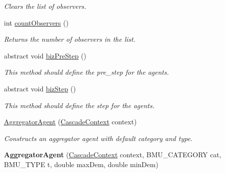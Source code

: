\begin{DoxyCompactItemize}
\begin{DoxyCompactList}\small\item\em Clears the list of observers. \end{DoxyCompactList}\item 
int \hyperlink{classuk_1_1ac_1_1dmu_1_1iesd_1_1cascade_1_1agents_1_1aggregators_1_1_aggregator_agent_a574243c5d86f601a4d1a150bec350df3}{count\-Observers} ()
\begin{DoxyCompactList}\small\item\em Returns the number of observers in the list. \end{DoxyCompactList}\item 
abstract void \hyperlink{classuk_1_1ac_1_1dmu_1_1iesd_1_1cascade_1_1agents_1_1aggregators_1_1_aggregator_agent_a9361ca72a6aebe4868b4d8b662088969}{biz\-Pre\-Step} ()
\begin{DoxyCompactList}\small\item\em This method should define the pre\-\_\-step for the agents. \end{DoxyCompactList}\item 
abstract void \hyperlink{classuk_1_1ac_1_1dmu_1_1iesd_1_1cascade_1_1agents_1_1aggregators_1_1_aggregator_agent_a7ef5c9ee76ef46f0b2d5f227bc885dae}{biz\-Step} ()
\begin{DoxyCompactList}\small\item\em This method should define the step for the agents. \end{DoxyCompactList}\item 
\hypertarget{classuk_1_1ac_1_1dmu_1_1iesd_1_1cascade_1_1agents_1_1aggregators_1_1_aggregator_agent_a35fce3f492c1e1305d3d776b1afa488b}{\hyperlink{classuk_1_1ac_1_1dmu_1_1iesd_1_1cascade_1_1agents_1_1aggregators_1_1_aggregator_agent_a35fce3f492c1e1305d3d776b1afa488b}{Aggregator\-Agent} (\hyperlink{classuk_1_1ac_1_1dmu_1_1iesd_1_1cascade_1_1context_1_1_cascade_context}{Cascade\-Context} context)}\label{classuk_1_1ac_1_1dmu_1_1iesd_1_1cascade_1_1agents_1_1aggregators_1_1_aggregator_agent_a35fce3f492c1e1305d3d776b1afa488b}

\begin{DoxyCompactList}\small\item\em Constructs an aggregator agent with default category and type. \end{DoxyCompactList}\item 
\hypertarget{classuk_1_1ac_1_1dmu_1_1iesd_1_1cascade_1_1agents_1_1aggregators_1_1_aggregator_agent_af1b3ab29df7a6e0100c6de145bd0a284}{{\bfseries Aggregator\-Agent} (\hyperlink{classuk_1_1ac_1_1dmu_1_1iesd_1_1cascade_1_1context_1_1_cascade_context}{Cascade\-Context} context, B\-M\-U\-\_\-\-C\-A\-T\-E\-G\-O\-R\-Y cat, B\-M\-U\-\_\-\-T\-Y\-P\-E t, double max\-Dem, double min\-Dem)}\label{classuk_1_1ac_1_1dmu_1_1iesd_1_1cascade_1_1agents_1_1aggregators_1_1_aggregator_agent_af1b3ab29df7a6e0100c6de145bd0a284}


\end{DoxyCompactItemize}
